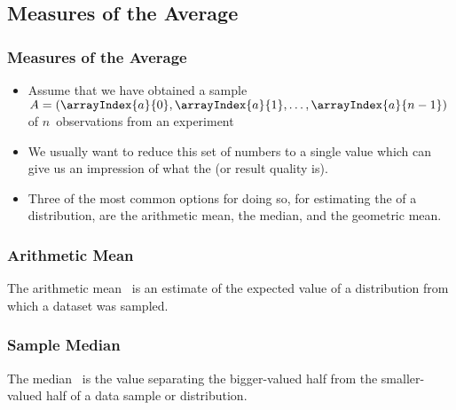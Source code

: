 \documentclass[aspectratio=169,mathserif,notheorems]{beamer}%
\begin{document}
\subsection{Measures of the Average}%
%
\begin{frame}%
\frametitle{Measures of the Average}%
\begin{itemize}%
\item Assume that we have obtained a sample~$A=(\arrayIndex{a}{0}, \arrayIndex{a}{1}, \dots, \arrayIndex{a}{n-1})$ of $n$~observations from an experiment%
\item<3-> We usually want to reduce this set of numbers to a single value which can give us an impression of what the  (or result quality is).%
\item<4-> Three of the most common options for doing so, for estimating the  of a distribution, are the \alert{arithmetic mean}, the \alert{median}, and the \alert{geometric mean}.%
\end{itemize}%
\end{frame}%
%
\begin{frame}%
\frametitle{Arithmetic Mean}%
%
\begin{definition*}%
The arithmetic mean~ is an \alert{estimate} of the expected value of a distribution from which a dataset was sampled.%
%
\end{definition*}%
\end{frame}%
%
\begin{frame}%
\frametitle{Sample Median}%
\begin{definition*}[Median]%
The median~ is the value separating the bigger-valued half from the smaller-valued half of a data sample or distribution.%
%
\end{definition*}%
%
\end{frame}%
\end{document}
